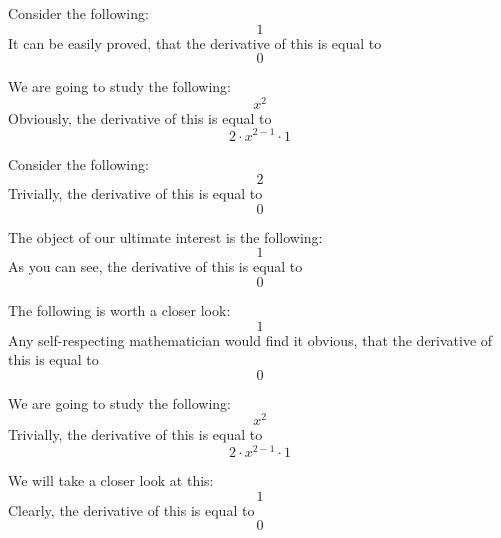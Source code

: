 \documentclass{article}
\begin{document}
Consider the following:
\begin{equation}
1 
\end{equation}
It can be easily proved, that the derivative of this is equal to
\begin{equation}
0 
\end{equation}

We are going to study the following:
\begin{equation}
x ^{2 } 
\end{equation}
Obviously, the derivative of this is equal to
\begin{equation}
2 \cdot x ^{2 - 1 } \cdot 1 
\end{equation}

Consider the following:
\begin{equation}
2 
\end{equation}
Trivially, the derivative of this is equal to
\begin{equation}
0 
\end{equation}

The object of our ultimate interest is the following:
\begin{equation}
1 
\end{equation}
As you can see, the derivative of this is equal to
\begin{equation}
0 
\end{equation}

The following is worth a closer look:
\begin{equation}
1 
\end{equation}
Any self-respecting mathematician would find it obvious, that the derivative of this is equal to
\begin{equation}
0 
\end{equation}

We are going to study the following:
\begin{equation}
x ^{2 } 
\end{equation}
Trivially, the derivative of this is equal to
\begin{equation}
2 \cdot x ^{2 - 1 } \cdot 1 
\end{equation}

We will take a closer look at this:
\begin{equation}
1 
\end{equation}
Clearly, the derivative of this is equal to
\begin{equation}
0 
\end{equation}
\end{document}
